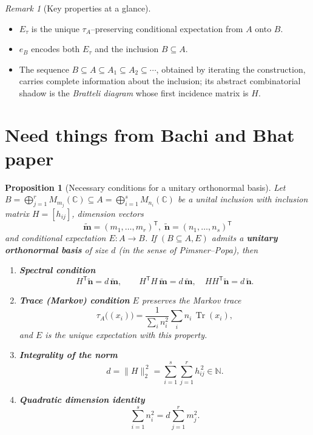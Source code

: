 \documentclass[11pt]{article}
\theoremstyle{mytheoremstyle}
\newtheorem{proposition}[theorem]{\color{MyPurple}Proposition}
\theoremstyle{definition}
\theoremstyle{remark}
\newtheorem{remark}[theorem]{\color{MyDarkGreen}Remark}
\DeclareMathOperator{\Tr}{Tr}
\newcommand{\bbC}{\mathbb{C}}
\begin{document}
\begin{remark}[Key properties at a glance]\leavevmode
\begin{itemize}
  \item
    \(E_\tau\) is the unique $\tau_A$–preserving conditional expectation
    from $A$ onto $B$.
  \item
    \(e_B\) encodes both \(E_\tau\) and the inclusion \(B\subseteq A\).
  \item
    The sequence \(B\subseteq A\subseteq A_1\subseteq A_2\subseteq\cdots\),
    obtained by iterating the construction, carries complete information
    about the inclusion; its abstract combinatorial shadow is the
    \emph{Bratteli diagram} whose first incidence matrix is \(H\).
\end{itemize}
\end{remark}


\newpage
\section{Need things from Bachi and Bhat paper}

\begin{proposition}[{\color{MyPurple}Necessary conditions for a unitary orthonormal basis}]
\leavevmode

Let $B=\bigoplus_{j=1}^{r}M_{m_j}(\bbC)\subseteq
      A=\bigoplus_{i=1}^{s}M_{n_i}(\mathbb{C})$ be a unital inclusion with
inclusion matrix $H=[h_{ij}]$, dimension vectors
\[
  \widetilde{\bm m}=(m_1,\dots,m_r)^{\!\mathsf T},\;\widetilde{\bm n}=(n_1,\dots,n_s)^{\!\mathsf T}
\]
and conditional expectation $E\colon A\to B$. 
If $(B\subseteq A,E)$ admits a \textbf{unitary orthonormal basis} of size $d$
(in the sense of Pimsner–Popa), then\vspace{0.4em}

\begin{enumerate}[label=\textup{(\arabic*)}]
  \item \textbf{Spectral condition}
        \[
   H^{\!\mathsf T}\widetilde{\bm n}=d\,\widetilde{\bm m},\qquad
           H^{\!\mathsf T}H\,\widetilde{\bm m}=d\,\widetilde{\bm m},\quad
           HH^{\!\mathsf T}\widetilde{\bm n}=d\,\widetilde{\bm n}.
\]

  \item \textbf{Trace (Markov) condition}\; 
        $E$ preserves the Markov trace
        \[
          \tau_A\!\bigl((x_i)\bigr)=\frac{1}{\sum_{i}n_i^{2}}
          \sum_{i} n_i\,\Tr(x_i),
\]
        and $E$ is the \emph{unique} expectation with this property.

  \item \textbf{Integrality of the norm}
        \[
          d=\lVert H\rVert_2^{\,2}
          =\sum_{i=1}^{s}\sum_{j=1}^{r}h_{ij}^{\,2}\in\mathbb{N}.
\]

  \item \textbf{Quadratic dimension identity}
        \[
          \sum_{i=1}^{s}n_i^{2}
          = 
          d\sum_{j=1}^{r}m_j^{2}.
\]
\end{enumerate}
\end{proposition}
\end{document}
